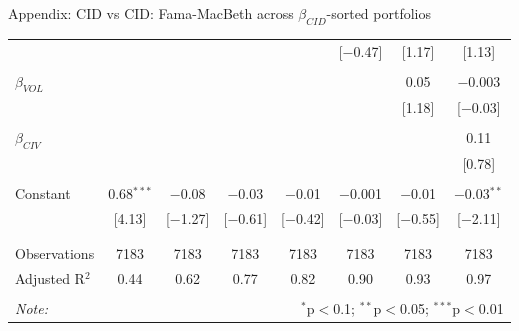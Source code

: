 \documentclass{beamer}
\begin{document}
{\begin{frame}{Appendix: CID vs CID: Fama-MacBeth across $\beta_{CID}$-sorted portfolios}
\begin{table}[!htbp]
\begin{tabular}{@{\extracolsep{-2pt}}lccccccc}
  &  &  &  &  & [$-$0.47] & [1.17] & [1.13] \\ 
  & & & & & & & \\ 
 $\beta_{VOL}$ &  &  &  &  &  & 0.05 & $-$0.003 \\ 
  &  &  &  &  &  & [1.18] & [$-$0.03] \\ 
  & & & & & & & \\ 
 $\beta_{CIV}$ &  &  &  &  &  &  & 0.11 \\ 
  &  &  &  &  &  &  & [0.78] \\ 
  & & & & & & & \\ 
 Constant & 0.68$^{***}$ & $-$0.08 & $-$0.03 & $-$0.01 & $-$0.001 & $-$0.01 & $-$0.03$^{**}$ \\ 
  & [4.13] & [$-$1.27] & [$-$0.61] & [$-$0.42] & [$-$0.03] & [$-$0.55] & [$-$2.11] \\ 
  & & & & & & & \\ 
\hline \\[-1.8ex] 
Observations & 7183 & 7183 & 7183 & 7183 & 7183 & 7183 & 7183 \\ 
Adjusted R$^{2}$ & 0.44 & 0.62 & 0.77 & 0.82 & 0.90 & 0.93 & 0.97 \\ 
\hline 
\hline \\[-1.8ex] 
\textit{Note:}  & \multicolumn{7}{r}{$^{*}$p$<$0.1; $^{**}$p$<$0.05; $^{***}$p$<$0.01} \\ 
\end{tabular} 
\end{table}
\end{frame}
}
\end{document}
